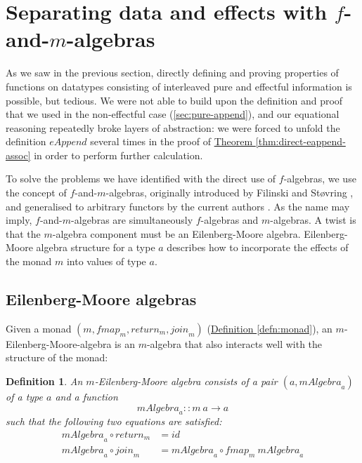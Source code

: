 \documentclass{jfp1}
\newtheorem{definition}{Definition}
\newcommand{\thmref}[1]{\hyperref[#1]{Theorem \ref*{#1}}}
\newcommand{\defref}[1]{\hyperref[#1]{Definition \ref*{#1}}}
\begin{document}
\section{Separating data and effects with $f$-and-$m$-algebras}
\label{sec:f-and-m-algebras}

As we saw in the previous section, directly defining and proving
properties of functions on datatypes consisting of interleaved pure
and effectful information is possible, but tedious. We were not able
to build upon the definition and proof that we used in the
non-effectful case (\autoref{sec:pure-append}), and our equational
reasoning repeatedly broke layers of abstraction: we were forced to
unfold the definition $\mathit{eAppend}$ several times in the proof of
\thmref{thm:direct-eappend-assoc} in order to perform further
calculation.

To solve the problems we have identified with the direct use of
$f$-algebras, we use the concept of $f$-and-$m$-algebras, originally
introduced by Filinski and St\o{}vring \cite{filinski07inductive}, and
generalised to arbitrary functors by the current authors
\cite{atkey12fibrational}. As the name may imply, $f$-and-$m$-algebras
are simultaneously $f$-algebras and $m$-algebras. A twist is that the
$m$-algebra component must be an Eilenberg-Moore
algebra. Eilenberg-Moore algebra structure for a type $a$ describes
how to incorporate the effects of the monad $m$ into values of type
$a$.

\subsection{Eilenberg-Moore algebras}
\label{sec:eilenberg-moore-algebras}

Given a monad $(m, \mathit{fmap}_m, \mathit{return}_m,
\mathit{join}_m)$ (\defref{defn:monad}), an
$m$-Eilenberg-Moore-algebra is an $m$-algebra that also interacts well
with the structure of the monad:

\begin{definition}
  An \emph{$m$-Eilenberg-Moore algebra} consists of a pair
  $(a,\mathit{mAlgebra}_a)$ of a type $a$ and a function
  \begin{displaymath}
    \mathit{mAlgebra}_a :: m~a \to a
  \end{displaymath}
  such that the following two equations are satisfied:
  \begin{align}
    \label{eq:em-alg-return}
    \mathit{mAlgebra}_a \circ \mathit{return}_m & = \mathit{id} \\
    \label{eq:em-alg-join}
    \mathit{mAlgebra}_a \circ \mathit{join}_m & = \mathit{mAlgebra}_a \circ \mathit{fmap}_m~\mathit{mAlgebra}_a
  \end{align}
\end{definition}
\end{document}
